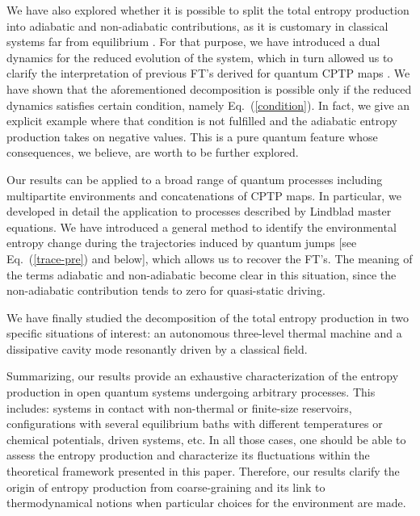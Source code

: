 \documentclass[aps,prx,twocolumn,showpacs,floatfix,superscriptaddress,graphics,longbibliography]{revtex4-1}
\begin{document}
We have also explored whether it is possible to split the total entropy production into adiabatic and non-adiabatic contributions, as it is customary in classical systems far from equilibrium  \cite{EspositoFacesI, EspositoFacesII}. 
For that purpose, we have introduced a dual dynamics for the reduced evolution of the system, which in turn  allowed us to clarify the interpretation of previous FT's derived for quantum CPTP maps \cite{MHP}. 
We have shown that the aforementioned decomposition is possible only if the reduced dynamics satisfies certain condition, namely Eq.~(\ref{condition}). 
In fact, we give an explicit example where that condition is not fulfilled and the adiabatic entropy production takes on negative values. 
This is a pure quantum feature whose consequences, we believe, are worth to be further explored.

Our results can be applied to a broad range of quantum processes including multipartite environments and concatenations of CPTP maps. In particular, we developed in detail the application to processes described by 
Lindblad master equations. We have introduced a general method to identify the environmental entropy change during the trajectories induced by quantum jumps [see Eq.~(\ref{trace-pre}) and below], which 
allows us to recover the FT's. The meaning of the terms adiabatic and non-adiabatic become clear in this situation, since the non-adiabatic contribution tends to zero for quasi-static driving.

We have finally studied the decomposition of the total entropy production in two specific situations of interest: an autonomous three-level thermal machine and  a dissipative cavity mode resonantly driven by a classical field.  

Summarizing, our results provide an exhaustive characterization of the entropy production in open quantum systems undergoing arbitrary processes. This includes: systems in contact with non-thermal or finite-size reservoirs, 
configurations with several equilibrium baths with different temperatures or chemical potentials, driven systems, etc. In all those cases, one should be able to assess the entropy production and characterize its fluctuations 
within the theoretical framework presented in this paper. Therefore, our results clarify the origin of entropy production from coarse-graining and its link 
to thermodynamical notions when particular choices for the environment are made.



\end{document}
